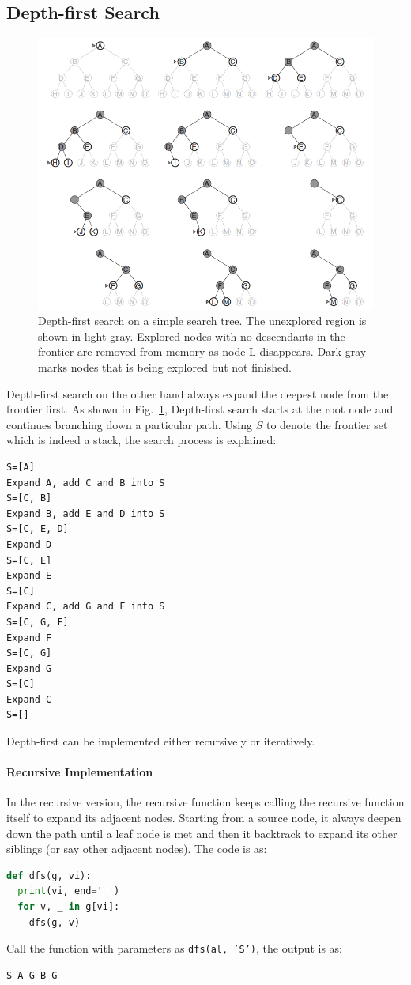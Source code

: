 \documentclass[../main.tex]{subfiles}
\begin{document}
\subsection{Depth-first Search}
\begin{figure}[!ht]
    \centering
     \includegraphics[width=0.96\columnwidth]{fig/general_depth_first_search.png}
    \caption{Depth-first search on a simple search tree. The unexplored region is shown in light gray. Explored nodes with no descendants in the frontier are removed from memory as node L disappears. Dark gray marks nodes that is being explored but not finished.   }
    \label{fig:depth_first_search_strategy}
\end{figure}
Depth-first search on the other hand always expand the deepest node from the frontier first. As shown in Fig.~\ref{fig:depth_first_search_strategy}, Depth-first search starts at the root node and continues branching down a particular path. Using $S$ to denote the frontier set which is indeed a stack, the search process is explained:
\begin{lstlisting}[numbers=none]
S=[A]
Expand A, add C and B into S
S=[C, B]
Expand B, add E and D into S
S=[C, E, D]
Expand D
S=[C, E]
Expand E
S=[C]
Expand C, add G and F into S
S=[C, G, F]
Expand F
S=[C, G]
Expand G
S=[C]
Expand C
S=[]
\end{lstlisting}
Depth-first can be implemented either recursively or iteratively. 
\paragraph{Recursive Implementation}In the recursive version, the recursive function keeps calling the recursive function itself to expand its adjacent nodes. Starting from a source node, it always deepen down the path until a leaf node is met and then it backtrack to expand its other siblings (or say other adjacent nodes). The code is as:
\begin{lstlisting}[language=Python]
def dfs(g, vi):
  print(vi, end=' ')
  for v, _ in g[vi]:   
    dfs(g, v)
\end{lstlisting}
Call the function with parameters as \texttt{dfs(al, 'S')}, the output is as:
\begin{lstlisting}[numbers=none]
S A G B G  
\end{lstlisting}
\end{document}
